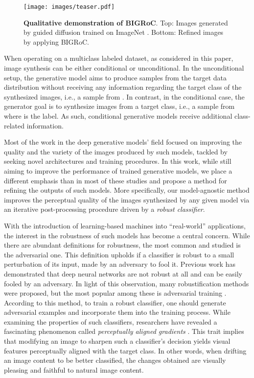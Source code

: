 \documentclass[10pt]{article} \usepackage[accepted]{tmlr}
\begin{document}
\begin{figure}[t]
    \centering
    \texttt{[image: images/teaser.pdf]}
    \caption{\textbf{Qualitative demonstration of BIGRoC}. Top: Images generated by guided diffusion trained on ImageNet . Bottom: Refined images by applying BIGRoC.}
    \label{fig:teaser}
\end{figure}


When operating on a multiclass labeled dataset, as considered in this paper, image synthesis can be either conditional or unconditional.
In the unconditional setup, the generative model aims to produce samples from the target data distribution without receiving any information regarding the target class of the synthesized images, i.e., a sample from .
In contrast, in the conditional case, the generator goal is to synthesize images from a target class, i.e., a sample from  where  is the label. 
As such, conditional generative models receive additional class-related information.

Most of the work in the deep generative models' field focused on improving the quality and the variety of the images produced by such models, tackled by seeking novel architectures and training procedures.
In this work, while still aiming to improve the performance of trained generative models, we place a different emphasis than in most of these studies and propose a method for refining the outputs of such models.
More specifically, our model-agnostic method improves the perceptual quality of the images synthesized by any given model via an iterative post-processing procedure driven by a \emph{robust classifier}.

With the introduction of learning-based machines into ``real-world'' applications, the interest in the robustness of such models has become a central concern.
While there are abundant definitions for robustness, the most common and studied is the adversarial one. 
This definition upholds if a classifier is robust to a small perturbation of its input, made by an adversary to fool it. 
Previous work \citep{szegedy2014intriguing, goodfellow2015explaining, kurakin2017adversarial} has demonstrated that deep neural networks are not robust at all and can be easily fooled by an adversary.
In light of this observation, many robustification methods were proposed, but the most popular among these is adversarial training \citep{goodfellow2015explaining, madry2019deep}.
According to this method, to train a robust classifier, one should generate adversarial examples and incorporate them into the training process.
While examining the properties of such classifiers, researchers have revealed a fascinating phenomenon called \emph{perceptually aligned gradients} \citep{tsipras2019robustness}. 
This trait implies that modifying an image to sharpen such a classifier's decision yields visual features perceptually aligned with the target class. In other words, when drifting an image content to be better classified, the changes obtained are visually pleasing and faithful to natural image content.
\end{document}
